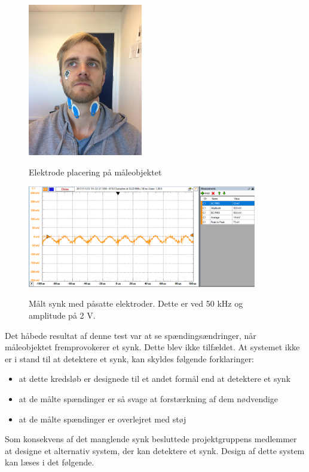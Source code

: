 \begin{figure}[H]
\centering
{\includegraphics[width=5cm]
{Figure/MartinElektroder}}
\caption{Elektrode placering på måleobjektet }
\label{fig:martin}
\end{figure}



   
\begin{figure}[H]
\centering
{\includegraphics[width=10cm]
{Figure/synk1}}
\caption{Målt synk med påsatte elektroder. Dette er ved 50 kHz og amplitude på 2 V.}
\label{fig:synk1}
\end{figure}


Det håbede resultat af denne test var at se spændingsændringer, når måleobjektet fremprovokerer et synk. Dette blev ikke tilfældet. At systemet ikke er i stand til at detektere et synk, kan skyldes følgende forklaringer:

\begin{itemize}
\item at dette kredsløb er designede til et andet formål end at detektere et synk
\item at de målte spændinger er så svage at forstærkning af dem nødvendige
\item at de målte spændinger er overlejret med støj 

\end{itemize} 

Som konsekvens af det manglende synk besluttede projektgruppens medlemmer at designe et alternativ system, der kan detektere et synk. Design af dette system kan læses i det følgende. 



